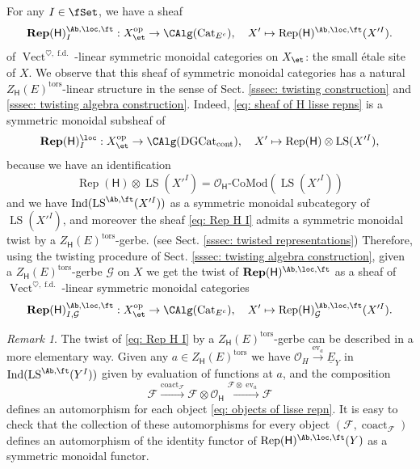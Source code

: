 \documentclass[10pt]{amsart}
\theoremstyle{remark}
\newtheorem{rmk}[subsubsection]{Remark}
\newcommand{\te}{\text}
\newcommand{\ul}{\underline}
\newcommand{\on}{\operatorname}
\newcommand{\cF}{\mathcal{F}}
\newcommand{\cG}{\mathcal{G}}
\newcommand{\cO}{\mathcal{O}}
\newcommand{\Cat}{\on{Cat}}
\newcommand{\CatEc}{\Cat_{E^c}}
\newcommand{\DGcat}{\on{DGCat}_{\on{cont}}}
\newcommand{\Rep}{\on{Rep}}
\newcommand{\Vect}{\on{Vect}}
\newcommand{\LS}{\on{LS}}
\DeclareMathOperator{\Ind}{Ind}
\DeclareMathOperator{\op}{op}
\newcommand{\VectAbfd}{\Vect^{\heartsuit,\on{f.d.}}}
\begin{document}
For any $I\in\fSet$, we have a sheaf 
\begin{equation}\label{eq: sheaf of H lisse repns}
 \mathbf{Rep}(\mathsf{H})^{\Ab,\loc,\ft}_I:
    X_{\et}^{\op}\rightarrow \CAlg(\CatEc),\quad X'\mapsto \Rep(\mathsf{H})^{\Ab,\loc,\ft}(X'^I).
\end{equation}
of $\VectAbfd$-linear symmetric monoidal categories on $X_{\et}$: the small \'etale site of $X$. We observe that this sheaf of symmetric monoidal categories has a natural $Z_{\mathsf{H}}(E)^{\on{tors}}$-linear structure in the sense of Sect. \ref{sssec: twisting construction} and \ref{sssec: twisting algebra construction}. Indeed, \eqref{eq: sheaf of H lisse repns} is a symmetric monoidal subsheaf of
\begin{equation}\label{eq: Rep H I}
    \mathbf{Rep}(\mathsf{H})^{\loc}_I: X^{\op}_{\et}\rightarrow \CAlg(\DGcat),\quad X'\mapsto \Rep(\mathsf{H})\otimes \LS(X'^I),
\end{equation}
because we have an identification
\[\Rep(\mathsf{H})\otimes \LS(X'^I)=\cO_{\mathsf{H}}\te{-CoMod}(\LS(X'^I))\]
and we have $\Ind(\LS^{\Ab,\ft}(X'^I))$ as a symmetric monoidal subcategory of $\LS(X'^I)$, and moreover the sheaf \eqref{eq: Rep H I} admits a symmetric monoidal twist by a $Z_{\mathsf{H}}(E)^{\on{tors}}$-gerbe. (see Sect. \ref{sssec: twisted representations}) Therefore, using the twisting procedure of Sect. \ref{sssec: twisting algebra construction}, given a $Z_{\mathsf{H}}(E)^{\on{tors}}$-gerbe $\cG$ on $X$ we get the twist of $\mathbf{Rep}(\mathsf{H})^{\Ab,\loc,\ft}$ as a sheaf of $\VectAbfd$-linear symmetric monoidal categories
\begin{equation}\label{eq: sheaf of twisted H lisse repns}
 \mathbf{Rep}(\mathsf{H})^{\Ab,\loc,\ft}_{I,\cG}:
    X_{\et}^{\op}\rightarrow \CAlg(\CatEc),\quad X'\mapsto \Rep(\mathsf{H})^{\Ab,\loc,\ft}_{\cG}(X'^I).
\end{equation}

\begin{rmk}
    The twist of \eqref{eq: Rep H I} by a $Z_{\mathsf{H}}(E)^{\on{tors}}$-gerbe can be described in a more elementary way. Given any $a\in Z_{\mathsf{H}}(E)^{\on{tors}}$ we have $\cO_H\xrightarrow{\on{ev}_a}\ul{E}_Y$ in $\Ind(\LS^{\Ab,\ft}(Y^I))$ given by evaluation of functions at $a$, and the composition
\[\cF\xrightarrow{\on{coact}_{\cF}}\cF\otimes \cO_{\mathsf{H}}\xrightarrow{\cF\otimes\on{ev}_a}\cF\]
defines an automorphism for each object \eqref{eq: objects of lisse repn}. It is easy to check that the collection of these automorphisms for every object $(\cF,\on{coact}_{\cF})$ defines an automorphism of the identity functor of $\Rep(\mathsf{H})^{\Ab,\loc,\ft}(Y)$ as a symmetric monoidal functor.
\end{rmk}
\end{document}
